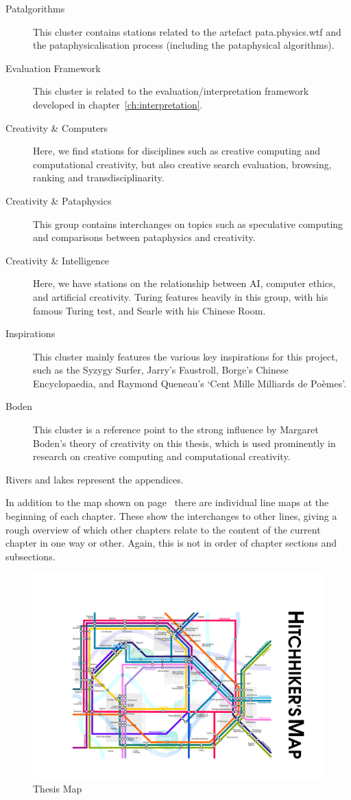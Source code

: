 \begin{description}
  \item [Patalgorithms] This cluster contains stations related to the artefact pata.physics.wtf and the pataphysicalisation process (including the pataphysical algorithms).
  \item [Evaluation Framework] This cluster is related to the evaluation/interpretation framework developed in chapter~\ref{ch:interpretation}.
  \item [Creativity \& Computers] Here, we find stations for disciplines such as creative computing and computational creativity, but also creative search evaluation, browsing, ranking and transdisciplinarity. 
  \item [Creativity \& Pataphysics] This group contains interchanges on topics such as speculative computing and comparisons between pataphysics and creativity.
  \item [Creativity \& Intelligence] Here, we have stations on the relationship between \acs{AI}, computer ethics, and artificial creativity. Turing features heavily in this group, with his famous Turing test, and Searle with his Chinese Room.
  \item [Inspirations] This cluster mainly features the various key inspirations for this project, such as the Syzygy Surfer, Jarry's Faustroll, Borge's Chinese Encyclopaedia, and Raymond Queneau's `Cent Mille Milliards de Poèmes'.
  \item [Boden] This cluster is a reference point to the strong influence by Margaret Boden's theory of creativity on this thesis, which is used prominently in research on creative computing and computational creativity.
\end{description}

Rivers and lakes represent the appendices. 

\spirals

In addition to the map shown on page~\pageref{map} there are individual line maps at the beginning of each chapter. These show the interchanges to other lines, giving a rough overview of which other chapters relate to the content of the current chapter in one way or other. Again, this is not in order of chapter sections and subsections.

\clearpage
\begin{figure}[!htbp]
\centering
  \includegraphics[width=\linewidth]{map}
\captionsetup{textformat=empty,labelformat=blank}
\caption[Thesis Map]{Thesis Map}
\label{map}
\end{figure}


\stopcontents[chapters]
